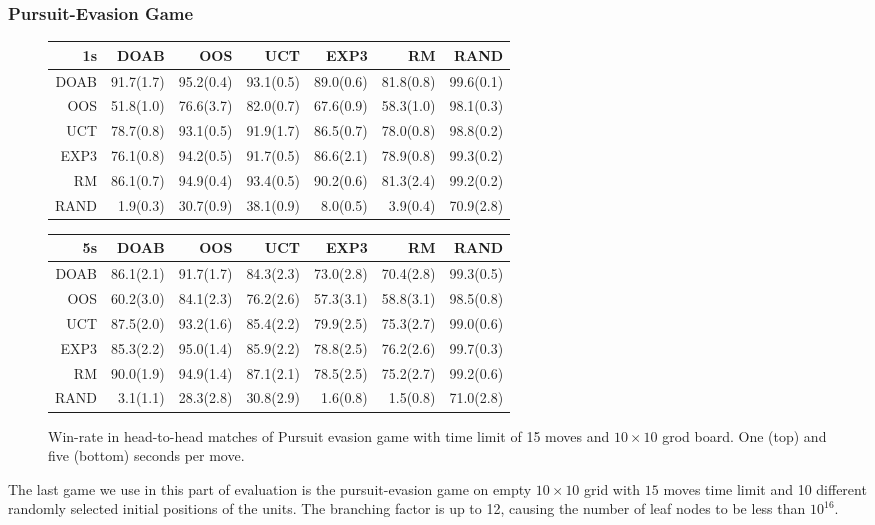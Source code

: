 \subsubsection{Pursuit-Evasion Game}
\begin{figure}
\centering
\begin{scriptsize}
\begin{tabular}{|r|rrrrrr|}\hline
1s&DOAB&OOS&UCT&EXP3&RM&RAND\\\hline
DOAB&91.7(1.7)&95.2(0.4)&93.1(0.5)&89.0(0.6)&81.8(0.8)&99.6(0.1)\\
OOS&51.8(1.0)&76.6(3.7)&82.0(0.7)&67.6(0.9)&58.3(1.0)&98.1(0.3)\\
UCT&78.7(0.8)&93.1(0.5)&91.9(1.7)&86.5(0.7)&78.0(0.8)&98.8(0.2)\\
EXP3&76.1(0.8)&94.2(0.5)&91.7(0.5)&86.6(2.1)&78.9(0.8)&99.3(0.2)\\
RM&86.1(0.7)&94.9(0.4)&93.4(0.5)&90.2(0.6)&81.3(2.4)&99.2(0.2)\\
RAND&1.9(0.3)&30.7(0.9)&38.1(0.9)&8.0(0.5)&3.9(0.4)&70.9(2.8)\\
\hline
\end{tabular}
\begin{tabular}{|r|rrrrrr|}\hline
5s&DOAB&OOS&UCT&EXP3&RM&RAND\\\hline
DOAB&86.1(2.1)&91.7(1.7)&84.3(2.3)&73.0(2.8)&70.4(2.8)&99.3(0.5)\\
OOS&60.2(3.0)&84.1(2.3)&76.2(2.6)&57.3(3.1)&58.8(3.1)&98.5(0.8)\\
UCT&87.5(2.0)&93.2(1.6)&85.4(2.2)&79.9(2.5)&75.3(2.7)&99.0(0.6)\\
EXP3&85.3(2.2)&95.0(1.4)&85.9(2.2)&78.8(2.5)&76.2(2.6)&99.7(0.3)\\
RM&90.0(1.9)&94.9(1.4)&87.1(2.1)&78.5(2.5)&75.2(2.7)&99.2(0.6)\\
RAND&3.1(1.1)&28.3(2.8)&30.8(2.9)&1.6(0.8)&1.5(0.8)&71.0(2.8)\\
\hline
\end{tabular}

\end{scriptsize}
\caption{Win-rate in head-to-head matches of Pursuit evasion game with time limit of 15 moves and $10\times 10$ grod board. One (top) and five (bottom) seconds per move.}\label{fig:matches:peg}
\end{figure}



The last game we use in this part of evaluation is the pursuit-evasion game on empty $10\times 10$ grid with $15$ moves time limit and 10 different randomly selected initial positions of the units. The branching factor is up to 12, causing the number of leaf nodes to be less than $10^16$.

